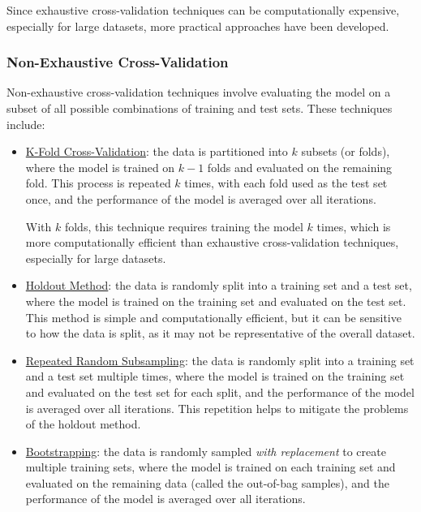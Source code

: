 Since exhaustive cross-validation techniques can be computationally expensive, especially for large datasets, more practical approaches have been developed.

\subsubsection{Non-Exhaustive Cross-Validation}
Non-exhaustive cross-validation techniques involve evaluating the model on a subset of all possible combinations of training and test sets. These techniques include:
\begin{itemize}
    \item \ul{K-Fold Cross-Validation}: the data is partitioned into $k$ subsets (or folds), where the model is trained on $k-1$ folds and evaluated on the remaining fold. This process is repeated $k$ times, with each fold used as the test set once, and the performance of the model is averaged over all iterations.
    
    With $k$ folds, this technique requires training the model $k$ times, which is more computationally efficient than exhaustive cross-validation techniques, especially for large datasets.

    \item \ul{Holdout Method}: the data is randomly split into a training set and a test set, where the model is trained on the training set and evaluated on the test set. This method is simple and computationally efficient, but it can be sensitive to how the data is split, as it may not be representative of the overall dataset.
    
    \item \ul{Repeated Random Subsampling}: the data is randomly split into a training set and a test set multiple times, where the model is trained on the training set and evaluated on the test set for each split, and the performance of the model is averaged over all iterations. This repetition helps to mitigate the problems of the holdout method.
    
    \item \ul{Bootstrapping}: the data is randomly sampled \emph{with replacement} to create multiple training sets, where the model is trained on each training set and evaluated on the remaining data (called the out-of-bag samples), and the performance of the model is averaged over all iterations.
    \label{sec:bootstrapping}
\end{itemize}



